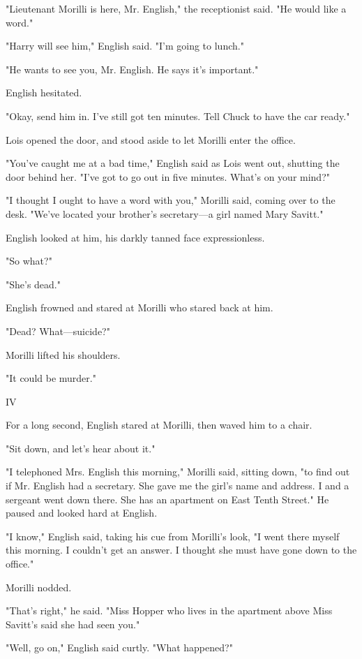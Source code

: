 \documentclass{novel}
\begin{document}
"Lieutenant Morilli is here, Mr. English," the receptionist said. "He would like a word."

"Harry will see him," English said. "I'm going to lunch."

"He wants to see you, Mr. English. He says it's important."

English hesitated.

"Okay, send him in. I've still got ten minutes. Tell Chuck to have the car ready."

Lois opened the door, and stood aside to let Morilli enter the office.

"You've caught me at a bad time," English said as Lois went out, shutting the door behind her. "I've got to go out in five minutes. What's on your mind?"

"I thought I ought to have a word with you," Morilli said, coming over to the desk. "We've located your brother's secretary—a girl named Mary Savitt."

English looked at him, his darkly tanned face expressionless.

"So what?"

"She's dead."

English frowned and stared at Morilli who stared back at him.

"Dead? What—suicide?"

Morilli lifted his shoulders.

"It could be murder."



IV

For a long second, English stared at Morilli, then waved him to a chair.

"Sit down, and let's hear about it."

"I telephoned Mrs. English this morning," Morilli said, sitting down, "to find out if Mr. English had a secretary. She gave me the girl's name and address. I and a sergeant went down there. She has an apartment on East Tenth Street." He paused and looked hard at English.

"I know," English said, taking his cue from Morilli's look, "I went there myself this morning. I couldn't get an answer. I thought she must have gone down to the office."

Morilli nodded.

"That's right," he said. "Miss Hopper who lives in the apartment above Miss Savitt's said she had seen you."

"Well, go on," English said curtly. "What happened?"
\end{document}
